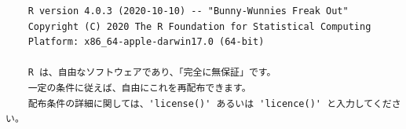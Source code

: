 \begin{Rscreen}{}{}
	\begin{verbatim}
	R version 4.0.3 (2020-10-10) -- "Bunny-Wunnies Freak Out"
	Copyright (C) 2020 The R Foundation for Statistical Computing
	Platform: x86_64-apple-darwin17.0 (64-bit)

	R は、自由なソフトウェアであり、「完全に無保証」です。
	一定の条件に従えば、自由にこれを再配布できます。
	配布条件の詳細に関しては、'license()' あるいは 'licence()' と入力してください。
	\end{verbatim}
\end{Rscreen}
